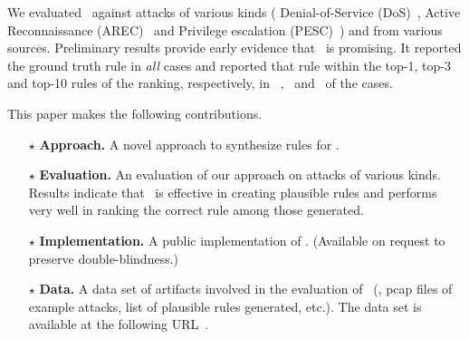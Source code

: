 \documentclass[conference]{IEEEtran}
\begin{document}

We evaluated \tname\ against \totalAttacks attacks of various kinds
(\eg{} Denial-of-Service (DoS)~\cite{denial-of-service}, Active
Reconnaissance (AREC)~\cite{active-reconnaissance} and Privilege
escalation (PESC)~\cite{privilege-escalation}) and from various
sources. Preliminary results provide early evidence that \tname\ is
promising. It reported the ground truth rule in \emph{all} cases and
reported that rule within the top-1, top-3 and top-10 rules of
the ranking, respectively, in \percTopOneRanking\ ,
\percTopThreeRanking\ and \percTopTenRanking\ of
the cases.





This paper makes the following contributions.

\newcommand{\Contrib}[1]{$\star$#1}
\begin{itemize}[topsep=.2ex,itemsep=.2ex,leftmargin=0.8em]

\item[\Contrib{}]\textbf{Approach.} A novel approach to synthesize
  rules for \nids.

\item[\Contrib{}]\textbf{Evaluation.} An evaluation of our approach on
  attacks of various kinds. Results indicate that \tname\ is effective
  in creating plausible rules and performs very well in ranking the
  correct rule among those generated.

\item[\Contrib{}]\textbf{Implementation.} A public implementation of
  \tname. (Available on request to preserve double-blindness.)

\item[\Contrib{}]\textbf{Data.} A data set of artifacts involved in
  the evaluation of \tname\ (\eg{}, pcap files of example attacks, list
  of plausible rules generated, etc.). The data set is available at
  the following URL~\ourdataset.
  
\end{itemize}
\end{document}
